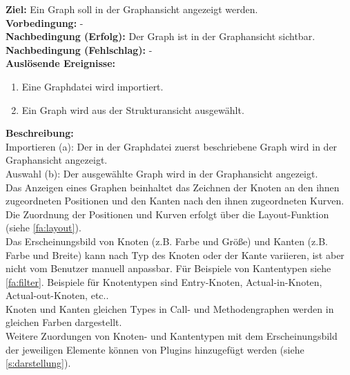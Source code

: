 \label{fa:graphen}
\textbf{Ziel:} Ein Graph soll in der Graphansicht angezeigt werden.\\
\textbf{Vorbedingung:} -\\
\textbf{Nachbedingung (Erfolg):} Der Graph ist in der Graphansicht sichtbar.\\
\textbf{Nachbedingung (Fehlschlag):} -\\
\textbf{Auslösende Ereignisse:}
\begin{enumerate}[nolistsep, label=(\alph*)]
  \item Eine Graphdatei wird importiert.
  \item Ein Graph wird aus der Strukturansicht ausgewählt.
\end{enumerate}
\textbf{Beschreibung:}\\
Importieren (a): Der in der Graphdatei zuerst beschriebene Graph wird in der Graphansicht angezeigt.\\
Auswahl (b): Der ausgewählte Graph wird in der Graphansicht angezeigt.\\
Das Anzeigen eines Graphen beinhaltet das Zeichnen der Knoten an den ihnen zugeordneten Positionen und den Kanten
nach den ihnen zugeordneten Kurven.
Die Zuordnung der Positionen und Kurven erfolgt über die Layout-Funktion (siehe \ref{fa:layout}).\\
Das Erscheinungsbild von Knoten (z.B. Farbe und Größe) und Kanten (z.B. Farbe und Breite) kann nach Typ des
Knoten oder der Kante variieren, ist aber nicht vom Benutzer manuell anpassbar.
Für Beispiele von Kantentypen siehe \ref{fa:filter}. Beispiele für Knotentypen sind Entry-Knoten, Actual-in-Knoten, Actual-out-Knoten, etc..\\
Knoten und Kanten gleichen Types in Call- und Methodengraphen werden in gleichen Farben dargestellt.\\
Weitere Zuordungen von Knoten- und Kantentypen mit dem Erscheinungsbild der jeweiligen Elemente können von
Plugins hinzugefügt werden (siehe \ref{s:darstellung}).

